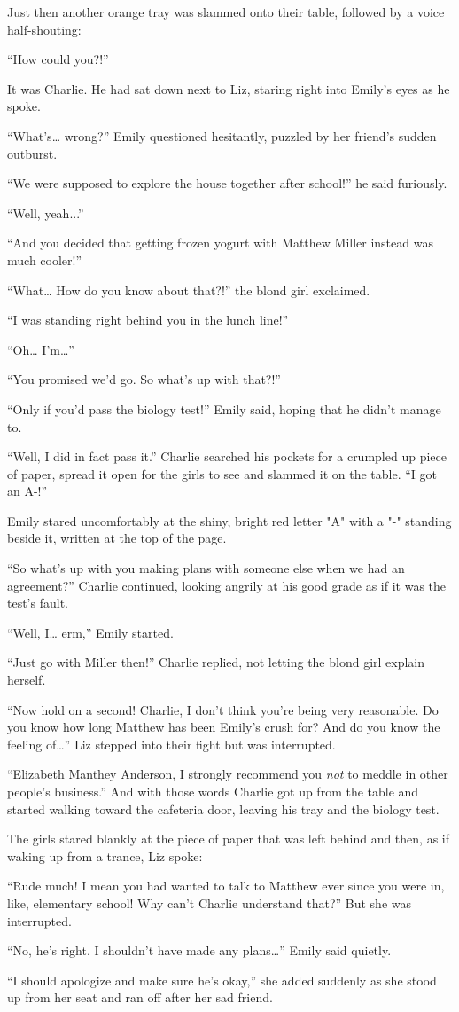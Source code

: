 Just then another orange tray was slammed onto their table, followed by a voice half-shouting:

“How could you?!”

It was Charlie. He had sat down next to Liz, staring right into Emily's eyes as he spoke.

“What's… wrong?” Emily questioned hesitantly, puzzled by her friend's sudden outburst.

“We were supposed to explore the house together after school!” he said furiously.

“Well, yeah...”

“And you decided that getting frozen yogurt with Matthew Miller instead was much cooler!”

“What… How do you know about that?!” the blond girl exclaimed.

“I was standing right behind you in the lunch line!”

“Oh… I'm…”

“You promised we'd go. So what's up with that?!”

“Only if you'd pass the biology test!” Emily said, hoping that he didn't manage to.

“Well, I did in fact pass it.” Charlie searched his pockets for a crumpled up piece of paper, spread it open for the girls to see and slammed it on the table. “I got an A-!”

Emily stared uncomfortably at the shiny, bright red letter "A" with a "-" standing beside it, written at the top of the page.

“So what's up with you making plans with someone else when we had an agreement?” Charlie continued, looking angrily at his good grade as if it was the test's fault.

“Well, I… erm,” Emily started.

“Just go with Miller then!” Charlie replied, not letting the blond girl explain herself.

“Now hold on a second! Charlie, I don't think you're being very reasonable. Do you know how long Matthew has been Emily's crush for? And do you know the feeling of…” Liz stepped into their fight but was interrupted.

“Elizabeth Manthey Anderson, I strongly recommend you \textit{not} to meddle in other people's business.” And with those words Charlie got up from the table and started walking toward the cafeteria door, leaving his tray and the biology test.

The girls stared blankly at the piece of paper that was left behind and then, as if waking up from a trance, Liz spoke:

“Rude much! I mean you had wanted to talk to Matthew ever since you were in, like, elementary school! Why can't Charlie understand that?” But she was interrupted.

“No, he's right. I shouldn't have made any plans…” Emily said quietly.

“I should apologize and make sure he's okay,” she added suddenly as she stood up from her seat and ran off after her sad friend.